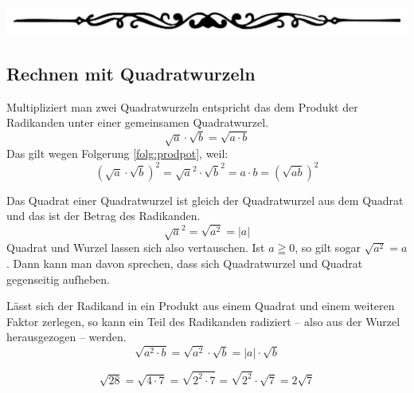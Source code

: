 \begin{center}
 \includegraphics[width=.5\textwidth]{./Vintage-Decorative-Divider.pdf}
\end{center}

\subsection{Rechnen mit Quadratwurzeln}

\begin{regel}
 Multipliziert man zwei Quadratwurzeln entspricht das dem Produkt der Radikanden unter einer gemeinsamen Quadratwurzel.
 \begin{equation*}
  \sqrt{a}\cdot\sqrt{b} = \sqrt{a\cdot b}
 \end{equation*}
 Das gilt wegen Folgerung \ref{folg:prodpot}, weil:
 \begin{equation*}
  \left(\sqrt{a}\cdot \sqrt{b}\right)^2 = \sqrt{a}^2 \cdot \sqrt{b}^2 = a\cdot b = \left(\sqrt{ab}\right)^2
 \end{equation*}
\end{regel}

\begin{folg}
Das Quadrat einer Quadratwurzel ist gleich der Quadratwurzel aus dem Quadrat und das ist der Betrag des Radikanden.
\begin{equation*}
 \sqrt{a}^2 =\sqrt{a^2} = |a|
\end{equation*}
Quadrat und Wurzel lassen sich also vertauschen. Ist \(a\geqq 0\), so gilt sogar \(\sqrt{a^2} = a\). Dann kann man davon sprechen, dass sich Quadratwurzel und Quadrat gegenseitig aufheben.
\end{folg}

\begin{regel}
 Lässt sich der Radikand in ein Produkt aus einem Quadrat und einem weiteren Faktor zerlegen, so kann ein Teil des Radikanden radiziert -- also aus der Wurzel herausgezogen -- werden.
 \begin{equation*}
  \sqrt{a^2\cdot b} = \sqrt{a^2} \cdot \sqrt{b} = |a|\cdot\sqrt{b}
 \end{equation*}
\end{regel}

\begin{bsp}
\begin{equation*}
 \sqrt{28} = \sqrt{4\cdot 7} = \sqrt{2^2\cdot 7} = \sqrt{2^2} \cdot \sqrt{7} = 2\sqrt{7}
\end{equation*} 
\end{bsp}

